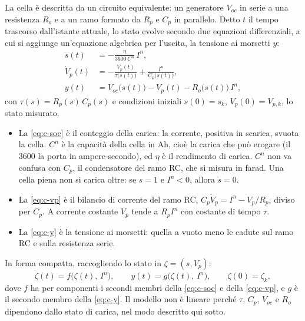 \documentclass[11pt,a4paper]{article}
\begin{document}
La cella è descritta da un circuito equivalente: un generatore $V_{oc}$ in
serie a una resistenza $R_o$ e a un ramo formato da $R_p$ e $C_p$ in parallelo.
Detto $t$ il tempo trascorso dall'istante attuale, lo stato evolve secondo due
equazioni differenziali, a cui si aggiunge un'equazione algebrica per l'uscita,
la tensione ai morsetti $y$:
\begin{align}
  \dot s(t) &= -\frac{\eta}{3600\,C^n}\, I^n ,
     \tag{C1}\label{eq:c-soc}\\
  \dot V_p(t) &= -\frac{V_p(t)}{\tau\bigl(s(t)\bigr)}
                 + \frac{I^n}{C_p\bigl(s(t)\bigr)} ,
     \tag{C2}\label{eq:c-vp}\\
  y(t) &= V_{oc}\bigl(s(t)\bigr) - V_p(t) - R_o\bigl(s(t)\bigr)\, I^n ,
     \tag{C3}\label{eq:c-y}
\end{align}
con $\tau(s) = R_p(s)\,C_p(s)$ e condizioni iniziali $s(0) = s_k$,
$V_p(0) = V_{p,k}$, lo stato misurato.
\begin{itemize}
  \item La \eqref{eq:c-soc} è il conteggio della carica: la corrente, positiva
        in scarica, svuota la cella. $C^n$ è la capacità della cella in Ah,
        cioè la carica che può erogare (il 3600 la porta in ampere-secondo),
        ed $\eta$ è il rendimento di carica. $C^n$ non va confusa con $C_p$,
        il condensatore del ramo RC, che si misura in farad. Una cella piena
        non si carica oltre: se $s = 1$ e $I^n < 0$, allora $\dot s = 0$.
  \item La \eqref{eq:c-vp} è il bilancio di corrente del ramo RC,
        $C_p \dot V_p = I^n - V_p / R_p$, diviso per $C_p$. A corrente
        costante $V_p$ tende a $R_p I^n$ con costante di tempo $\tau$.
  \item La \eqref{eq:c-y} è la tensione ai morsetti: quella a vuoto meno le
        cadute sul ramo RC e sulla resistenza serie.
\end{itemize}
In forma compatta, raccogliendo lo stato in $\zeta = (s, V_p)$:
\begin{equation}
  \dot \zeta(t) = f\bigl(\zeta(t),\, I^n\bigr), \qquad
  y(t) = g\bigl(\zeta(t),\, I^n\bigr), \qquad \zeta(0) = \zeta_k ,
  \tag{C4}\label{eq:c-compatta}
\end{equation}
dove $f$ ha per componenti i secondi membri della \eqref{eq:c-soc} e della
\eqref{eq:c-vp}, e $g$ è il secondo membro della \eqref{eq:c-y}. Il modello non
è lineare perché $\tau$, $C_p$, $V_{oc}$ e $R_o$ dipendono dallo stato di
carica, nel modo descritto qui sotto.
\end{document}
